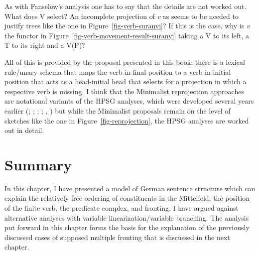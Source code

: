 As with Fanselow's analysis one has to say that the details are not worked out. What does V select?
An incomplete projection of \emph{v} as seems to be needed to justify trees like the one in
Figure~\ref{fig-verb-suranyi}? If this is the case, why is \emph{v} the functor in
Figure~\ref{fig-verb-movement-result-suranyi} taking a V to its left, a T to its right and a V(P)?


All of this is provided by the proposal presented in this book: there is a lexical rule/unary schema that maps
the verb in final position to a verb in initial position that acts as a head-initial head that
selects for a projection in which a respective verb is missing. I think that the Minimalist
reprojection approaches are notational variants of the HPSG analyses, which were developed several
years earlier (\citealp*[Section~4.7]{KW91a}; \citealp*{Kiss93}; \citealp*{Frank94}; \citealp*{Kiss95a}; \citealp{Feldhaus97},
\citealp{Meurers2000b}) but while the Minimalist proposals remain on the level of sketches like the
one in Figure~\ref{fig-reprojection}, the HPSG analyses are worked out in detail.




\section{Summary}

In this chapter, I have presented a model of German sentence structure which can explain the relatively
free ordering of constituents in the Mittelfeld, the position of the finite verb, the predicate complex,
and fronting. I have argued against alternative analyses with variable linearization/variable branching.
The analysis put forward in this chapter forms the basis for the explanation of the previously discussed cases 
of supposed multiple fronting that is discussed in the next chapter. 


